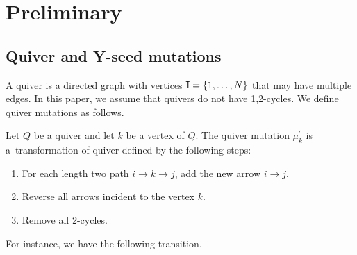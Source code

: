 \documentclass[pdftex]{sigma}
\numberwithin{equation}{section}
\begin{document}
	\section{Preliminary}

	\subsection{Quiver and Y-seed mutations}
A quiver is a directed graph with vertices ${\bf I}=\{1,\dots,N\}$ that may have multiple edges.
In this paper, we assume that quivers do not have 1,2-cycles.
We define quiver mutations as follows.
		\begin{Definition}
		Let $Q$ be a quiver and let $k$ be a vertex of $Q$.
		The quiver mutation $\mu_k^\prime$ is a~transformation of quiver defined by the following steps:
			\begin{enumerate}\itemsep=0pt
			\item For each length two path $i\rightarrow k\rightarrow j$, add the new arrow $i\rightarrow j$.
			\item Reverse all arrows incident to the vertex $k$.
			\item Remove all 2-cycles.
			\end{enumerate}
		\end{Definition}
For instance, we have the following transition.
\end{document}
